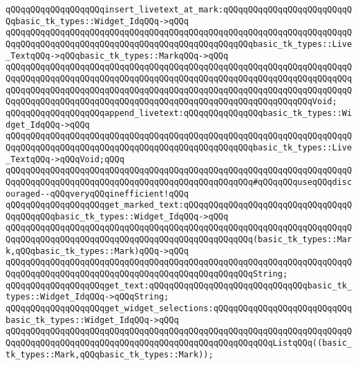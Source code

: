 \verb|qQQqqQQqqQQqqQQqqQQqinsert_livetext_at_mark:qQQqqQQqqQQqqQQqqQQqqQQqqQQqbasic_tk_types::Widget_IdqQQq->qQQq|\newline
\verb|qQQqqQQqqQQqqQQqqQQqqQQqqQQqqQQqqQQqqQQqqQQqqQQqqQQqqQQqqQQqqQQqqQQqqQQqqQQqqQQqqQQqqQQqqQQqqQQqqQQqqQQqqQQqqQQqqQQqqQQqbasic_tk_types::Live_TextqQQq->qQQqbasic_tk_types::MarkqQQq->qQQq|\newline
\verb|qQQqqQQqqQQqqQQqqQQqqQQqqQQqqQQqqQQqqQQqqQQqqQQqqQQqqQQqqQQqqQQqqQQqqQQqqQQqqQQqqQQqqQQqqQQqqQQqqQQqqQQqqQQqqQQqqQQqqQQqqQQqqQQqqQQqqQQqqQQqqQQqqQQqqQQqqQQqqQQqqQQqqQQqqQQqqQQqqQQqqQQqqQQqqQQqqQQqqQQqqQQqqQQqqQQqqQQqqQQqqQQqqQQqqQQqqQQqqQQqqQQqqQQqqQQqqQQqqQQqqQQqqQQqqQQqVoid;|\newline
\verb|qQQqqQQqqQQqqQQqqQQqappend_livetext:qQQqqQQqqQQqqQQqbasic_tk_types::Widget_IdqQQq->qQQq|\newline
\verb|qQQqqQQqqQQqqQQqqQQqqQQqqQQqqQQqqQQqqQQqqQQqqQQqqQQqqQQqqQQqqQQqqQQqqQQqqQQqqQQqqQQqqQQqqQQqqQQqqQQqqQQqqQQqqQQqqQQqqQQqbasic_tk_types::Live_TextqQQq->qQQqVoid;qQQq|\newline
\verb|qQQqqQQqqQQqqQQqqQQqqQQqqQQqqQQqqQQqqQQqqQQqqQQqqQQqqQQqqQQqqQQqqQQqqQQqqQQqqQQqqQQqqQQqqQQqqQQqqQQqqQQqqQQqqQQqqQQqqQQq#qQQqqQQquseqQQqdiscouraged--qQQqveryqQQqinefficient!qQQq|\newline
\newline
\newline
\verb|qQQqqQQqqQQqqQQqqQQqget_marked_text:qQQqqQQqqQQqqQQqqQQqqQQqqQQqqQQqqQQqqQQqqQQqbasic_tk_types::Widget_IdqQQq->qQQq|\newline
\verb|qQQqqQQqqQQqqQQqqQQqqQQqqQQqqQQqqQQqqQQqqQQqqQQqqQQqqQQqqQQqqQQqqQQqqQQqqQQqqQQqqQQqqQQqqQQqqQQqqQQqqQQqqQQqqQQqqQQqqQQq(basic_tk_types::Mark,qQQqbasic_tk_types::Mark)qQQq->qQQq|\newline
\verb|qQQqqQQqqQQqqQQqqQQqqQQqqQQqqQQqqQQqqQQqqQQqqQQqqQQqqQQqqQQqqQQqqQQqqQQqqQQqqQQqqQQqqQQqqQQqqQQqqQQqqQQqqQQqqQQqqQQqqQQqString;|\newline
\verb|qQQqqQQqqQQqqQQqqQQqget_text:qQQqqQQqqQQqqQQqqQQqqQQqqQQqqQQqbasic_tk_types::Widget_IdqQQq->qQQqString;|\newline
\newline
\verb|qQQqqQQqqQQqqQQqqQQqget_widget_selections:qQQqqQQqqQQqqQQqqQQqqQQqqQQqbasic_tk_types::Widget_IdqQQq->qQQq|\newline
\verb|qQQqqQQqqQQqqQQqqQQqqQQqqQQqqQQqqQQqqQQqqQQqqQQqqQQqqQQqqQQqqQQqqQQqqQQqqQQqqQQqqQQqqQQqqQQqqQQqqQQqqQQqqQQqqQQqqQQqqQQqqQQqListqQQq((basic_tk_types::Mark,qQQqbasic_tk_types::Mark));|\newline
